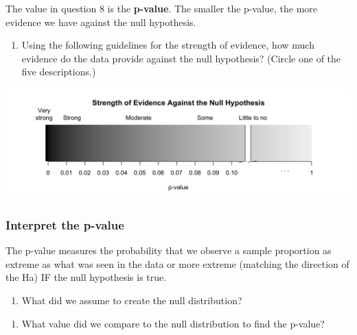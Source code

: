 \documentclass[
]{report}
\providecommand{\tightlist}{%
  \setlength{\itemsep}{0pt}\setlength{\parskip}{0pt}}
\begin{document}
The value in question 8 is the \textbf{p-value}. The smaller the p-value, the more evidence we have against the null hypothesis.

\begin{enumerate}
\def\labelenumi{\arabic{enumi}.}
\setcounter{enumi}{8}
\tightlist
\item
  Using the following guidelines for the strength of evidence, how much evidence do the data provide against the null hypothesis? (Circle one of the five descriptions.)
\end{enumerate}

\begin{center}\includegraphics[width=0.9\linewidth]{images/soe_gradient_gray} \end{center}

\hypertarget{interpret-the-p-value}{%
\subsubsection*{Interpret the p-value}\label{interpret-the-p-value}}

The p-value measures the probability that we observe a sample proportion as extreme as what was seen in the data or more extreme (matching the direction of the Ha) IF the null hypothesis is true.

\begin{enumerate}
\def\labelenumi{\arabic{enumi}.}
\setcounter{enumi}{9}
\tightlist
\item
  What did we assume to create the null distribution?
\end{enumerate}

\vspace{0.7in}

\begin{enumerate}
\def\labelenumi{\arabic{enumi}.}
\setcounter{enumi}{10}
\tightlist
\item
  What value did we compare to the null distribution to find the p-value?
\end{enumerate}

\vspace{0.3in}
\end{document}
